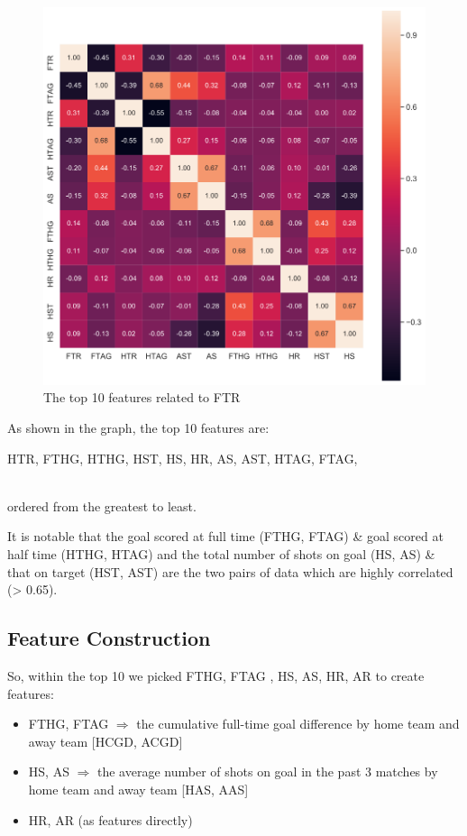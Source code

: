 \documentclass{article}
\begin{document}
\begin{figure}[ht]
\centering
\includegraphics[scale=0.2]{graphs/top-10-features-in-raw-data.png}
\caption{The top 10 features related to FTR}
\label{fig:top-10-features-in-raw-data}
\end{figure}

As shown in the graph, the top 10 features are: \\
\centerline{HTR,  FTHG, HTHG, HST, HS, HR, AS, AST, HTAG, FTAG,}	\\
ordered from the greatest to least.

It is notable that the goal scored at full time (FTHG, FTAG)  \& goal scored at half time (HTHG, HTAG) and
the total number of shots on goal (HS, AS)  \& that on target (HST, AST) are the two pairs of data which are highly correlated (> 0.65).

\subsection{Feature Construction}
So, within the top 10 we picked FTHG, FTAG , HS, AS,  HR, AR to create features:
\begin{itemize}
\item FTHG, FTAG $\Rightarrow$ the cumulative full-time goal difference by home team and away team [HCGD, ACGD]
\item HS, AS $\Rightarrow$  the average number of shots on goal in the past 3 matches by home team and away team [HAS, AAS]
\item HR, AR (as features directly) 
\end{itemize}
\end{document}
